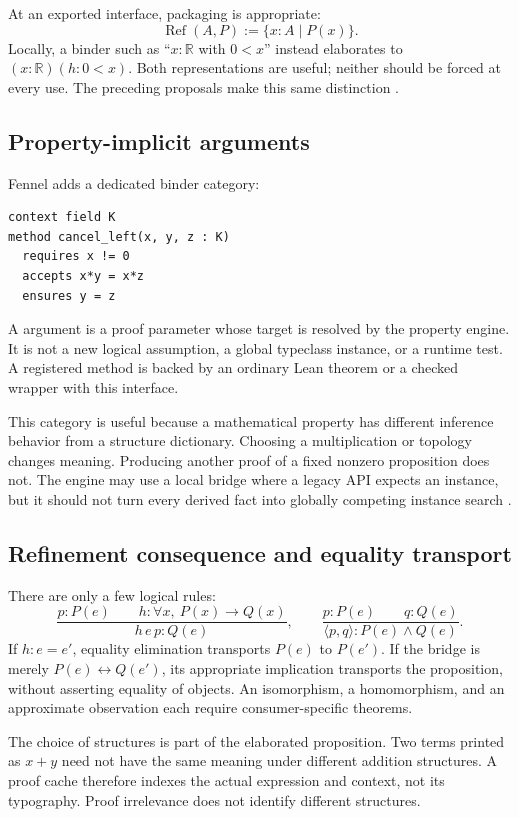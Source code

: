 \documentclass[11pt,a4paper]{article}
\theoremstyle{definition}
\theoremstyle{remark}
\newcommand{\code}[1]{\texttt{\detokenize{#1}}}
\newcommand{\RR}{\mathbb R}
\begin{document}
At an exported interface, packaging is appropriate:
\[
 \operatorname{Ref}(A,P):=\{x:A\mid P(x)\}.
\]
Locally, a binder such as ``$x:\RR$ with $0<x$'' instead elaborates to
$(x:\RR)(h:0<x)$. Both representations are useful; neither should be forced
at every use. The preceding proposals make this same distinction
\cite{synA,synB,trellis}.

\subsection{Property-implicit arguments}
Fennel adds a dedicated binder category:
\begin{lstlisting}
context field K
method cancel_left(x, y, z : K)
  requires x != 0
  accepts x*y = x*z
  ensures y = z
\end{lstlisting}
A \code{requires} argument is a proof parameter whose target is resolved by
the property engine. It is not a new logical assumption, a global typeclass
instance, or a runtime test. A registered method is backed by an ordinary Lean
theorem or a checked wrapper with this interface.

This category is useful because a mathematical property has different inference
behavior from a structure dictionary. Choosing a multiplication or topology
changes meaning. Producing another proof of a fixed nonzero proposition does
not. The engine may use a local \code{Fact} bridge where a legacy API expects an
instance, but it should not turn every derived fact into globally competing
instance search \cite{synA,synB}.

\subsection{Refinement consequence and equality transport}
There are only a few logical rules:
\[
 \frac{p:P(e)\qquad h:\forall x,\ P(x)\to Q(x)}{h\,e\,p:Q(e)},
 \qquad
 \frac{p:P(e)\qquad q:Q(e)}{\langle p,q\rangle:P(e)\land Q(e)}.
\]
If $h:e=e'$, equality elimination transports $P(e)$ to $P(e')$.
If the bridge is merely $P(e)\leftrightarrow Q(e')$, its appropriate implication
transports the proposition, without asserting equality of objects.
An isomorphism, a homomorphism, and an approximate observation each require
consumer-specific theorems.

The choice of structures is part of the elaborated proposition. Two terms
printed as $x+y$ need not have the same meaning under different addition
structures. A proof cache therefore indexes the actual expression and context,
not its typography. Proof irrelevance does not identify different structures.
\end{document}
